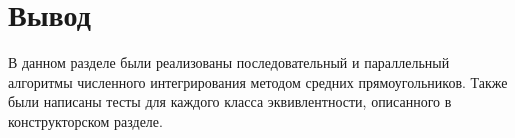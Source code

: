 \section{Вывод}

В данном разделе были реализованы последовательный и параллельный алгоритмы
численного интегрирования методом средних прямоугольников. Также были написаны
тесты для каждого класса эквивлентности, описанного в конструкторском разделе.
